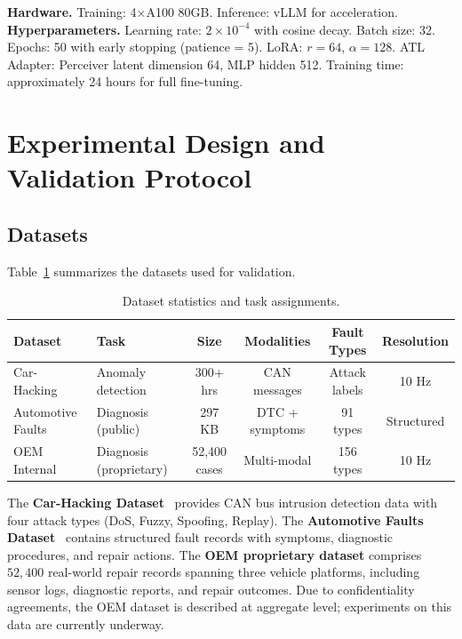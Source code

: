\documentclass[11pt,a4paper]{article}
\begin{document}
\textbf{Hardware.} Training: 4$\times$A100 80GB. Inference: vLLM for acceleration. \textbf{Hyperparameters.} Learning rate: $2 \times 10^{-4}$ with cosine decay. Batch size: 32. Epochs: 50 with early stopping (patience = 5). LoRA: $r = 64$, $\alpha = 128$. ATL Adapter: Perceiver latent dimension 64, MLP hidden 512. Training time: approximately 24 hours for full fine-tuning.

\section{Experimental Design and Validation Protocol}\label{sec:experiments}

\subsection{Datasets}\label{sec:exp:data}

Table~\ref{tab:datasets} summarizes the datasets used for validation.

\begin{table}[htbp]
\centering
\caption{Dataset statistics and task assignments.}
\label{tab:datasets}
\begin{tabular}{llcccc}
\toprule
\textbf{Dataset} & \textbf{Task} & \textbf{Size} & \textbf{Modalities} & \textbf{Fault Types} & \textbf{Resolution} \\
\midrule
Car-Hacking~\cite{song2020carhacking} & Anomaly detection & 300+ hrs & CAN messages & Attack labels & 10 Hz \\
Automotive Faults~\cite{zenodo2025faults} & Diagnosis (public) & 297 KB & DTC + symptoms & 91 types & Structured \\
OEM Internal & Diagnosis (proprietary) & 52,400 cases & Multi-modal & 156 types & 10 Hz \\
\bottomrule
\end{tabular}
\end{table}

The \textbf{Car-Hacking Dataset}~\cite{song2020carhacking} provides CAN bus intrusion detection data with four attack types (DoS, Fuzzy, Spoofing, Replay). The \textbf{Automotive Faults Dataset}~\cite{zenodo2025faults} contains structured fault records with symptoms, diagnostic procedures, and repair actions. The \textbf{OEM proprietary dataset} comprises $52{,}400$ real-world repair records spanning three vehicle platforms, including sensor logs, diagnostic reports, and repair outcomes. Due to confidentiality agreements, the OEM dataset is described at aggregate level; experiments on this data are currently underway.
\end{document}
